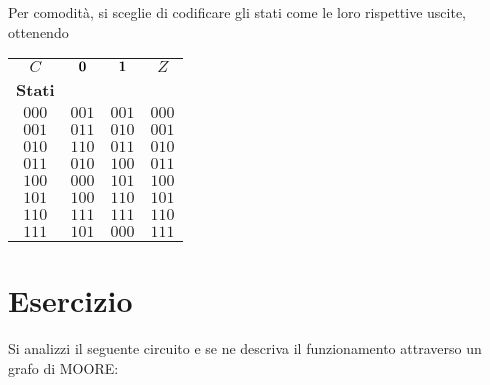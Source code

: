 \documentclass[a4paper]{extarticle}
\renewcommand\arraystretch{}
\begin{document}
\vspace{1em}
\noindent
Per comodità, si sceglie di codificare gli stati come le loro rispettive uscite, ottenendo

\vspace{1em}
\noindent
\begin{table}[H]
\setlength{\tabcolsep}{4pt}
\renewcommand{\arraystretch}{1.2}
\centering
\begin{tabular}{c|c|c|c}
    $C$ & $\bf{0}$ & $\bf{1}$ & $Z$\\
    \textbf{Stati} &    &     &\\
    \hline
    $000$  & $001$ & $001$ & $000$\\
    $001$  & $011$ & $010$ & $001$\\
    $010$  & $110$ & $011$ & $010$\\
    $011$  & $010$ & $100$ & $011$\\
    $100$  & $000$ & $101$ & $100$\\
    $101$  & $100$ & $110$ & $101$\\
    $110$  & $111$ & $111$ & $110$\\
    $111$  & $101$ & $000$ & $111$\\
\end{tabular}
\end{table}

\noindent
\section{Esercizio}
Si analizzi il seguente circuito e se ne descriva il funzionamento attraverso un grafo di MOORE:
\end{document}
